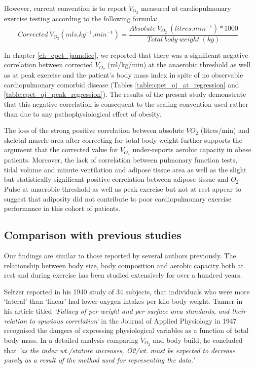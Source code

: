 However, current convention is to report $\dot{V}_{O_2}$ measured at cardiopulmonary exercise testing according to the following formula: 
\[Corrected\ \dot{V}_{O_2} (mls.kg^{-1}.min^{-1}) = \frac{Absolute\ \dot{V}_{O_2}\ (litres.min^{-1}) * 1000}{Total\ body\ weight\ (kg)}\]

In chapter \ref{ch_cpet_jaundice}, we reported that there was a significant negative correlation between corrected $\dot{V}_{O_2}$ (ml/kg/min) at the anaerobic threshold as well as at peak exercise and the patient's body mass index in spite of no observable cardiopulmonary comorbid disease (Tables \ref{table:cpet_oj_at_regression} and \ref{table:cpet_oj_peak_regression}). 
The results of the present study demonstrate that this negative correlation is consequent to the scaling convention used rather than due to any pathophysiological effect of obesity. 

The loss of the strong positive correlation between absolute $VO_{2}$ (litres/min) and skeletal muscle area after correcting for total body weight further supports the argument that the corrected value for $\dot{V}_{O_2}$ under-reports aerobic capacity in obese patients. 
Moreover, the lack of correlation between pulmonary function tests, tidal volume and minute ventilation and adipose tissue area as well as the slight but statistically significant positive correlation between adipose tissue and $O_2$Pulse at anaerobic threshold as well as peak exercise but not at rest appear to suggest that adiposity did not contribute to poor cardiopulmonary exercise performance in this cohort of patients.

\subsection{Comparison with previous studies}
Our findings are similar to those reported by several authors previously. 
The relationship between body size, body composition and aerobic capacity both at rest and during exercise has been studied extensively for over a hundred years.

Seltzer reported in his 1940 study of 34 subjects, that individuals who were more `lateral' than `linear' had lower oxygen intakes per kilo body weight.\parencite{seltzer_body_1940} Tanner in his article titled \textit{`Fallacy of per-weight and per-surface area standards, and their relation to spurious correlation'}\parencite{tanner_fallacy_1949} in the Journal of Applied Physiology in 1947 recognised the dangers of expressing physiological variables as a function of total body mass. 
In a detailed analysis comparing $\dot{V}_{O_2}$ and body build, he concluded that \textit{'as the index wt./stature increases, O2/wt. 
must be expected to decrease purely as a result of the method used for representing the data.'}

